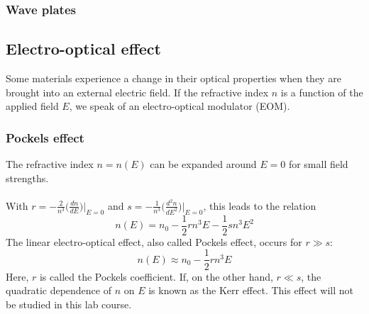 \subsubsection{Wave plates}


\newpage
\subsection{Electro-optical effect}
Some materials experience a change in their optical properties when they are
brought into an external electric field. If the refractive index $n$ is a
function of the applied field $E$, we speak of an electro-optical modulator
(EOM).

\subsubsection{Pockels effect}
The refractive index $n=n(E)$ can be expanded around $E=0$
for small field strengths. \\ \\ With
$r=-\frac{2}{n^3}\bigg(\frac{dn}{dE}\bigg)\bigg|_{E=0}$ and
$s=-\frac{1}{n^3}\bigg(\frac{d^2n}{dE^2}\bigg)\bigg|_{E=0}$,
this leads to the relation
$$n(E)=n_0-\frac{1}{2}rn^3E-\frac{1}{2}sn^3E^2$$
The linear electro-optical effect, also called Pockels effect,
occurs for $r\gg s$:
$$n(E)\approx n_0-\frac{1}{2}rn^3E$$
Here, $r$ is called the Pockels coefficient. If, on the other hand, $r\ll s$,
the quadratic dependence of $n$ on $E$ is known as the Kerr effect.
This effect will not be studied in this lab course.

